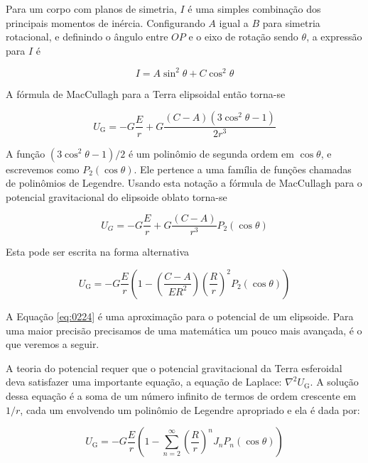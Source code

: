 \documentclass[]{book}
\theoremstyle{definition}
\theoremstyle{definition}
\theoremstyle{definition}
\theoremstyle{remark}
\begin{document}
Para um corpo com planos de simetria, \(I\) é uma simples combinação dos principais momentos de inércia. Configurando \(A\) igual a \(B\) para simetria rotacional, e definindo o ângulo entre \(OP\) e o eixo de rotação sendo \(\theta\), a expressão para \(I\) é

\begin{equation}
I=A \sin ^{2} \theta+C \cos ^{2} \theta \label{eq:0221}
\end{equation}

A fórmula de MacCullagh para a Terra elipsoidal então torna-se

\begin{equation}
U_{\mathrm{G}}=-G \frac{E}{r}+G \frac{(C-A)\left(3 \cos ^{2} \theta - 1\right)}{2 r^{3}} \label{eq:0222}
\end{equation}

A função \(\left(3 \cos ^{2} \theta - 1\right) / 2\) é um polinômio de segunda ordem em \(\cos\theta\), e escrevemos como \(P_2(\cos\theta)\). Ele pertence a uma família de funções chamadas de polinômios de Legendre. Usando esta notação a fórmula de MacCullagh para o potencial gravitacional do elipsoide oblato torna-se

\begin{equation}
U_{G}=-G \frac{E}{r}+G \frac{(C-A)}{r^{3}} P_{2}(\cos \theta)  \label{eq:0223}
\end{equation}

Esta pode ser escrita na forma alternativa

\begin{equation}
U_{\mathrm{G}}=-G \frac{E}{r}\left(1-\left(\frac{C-A}{E R^{2}}\right)\left(\frac{R}{r}\right)^{2} P_{2}(\cos \theta)\right) \label{eq:0224}
\end{equation}

A Equação \eqref{eq:0224} é uma aproximação para o potencial de um elipsoide. Para uma maior precisão precisamos de uma matemática um pouco mais avançada, é o que veremos a seguir.

A teoria do potencial requer que o potencial gravitacional da Terra esferoidal deva satisfazer uma importante equação, a equação de Laplace: \(\nabla^2U_\mathrm{G}\). A solução dessa equação é a soma de um número infinito de termos de ordem crescente em \(1/r\), cada um envolvendo um polinômio de Legendre apropriado e ela é dada por:

\begin{equation}
U_{\mathrm{G}}=-G \frac{E}{r}\left(1-\sum_{n=2}^{\infty}\left(\frac{R}{r}\right)^{n} J_{n} P_{n}(\cos \theta)\right)
\label{eq:0225}
\end{equation}
\end{document}

